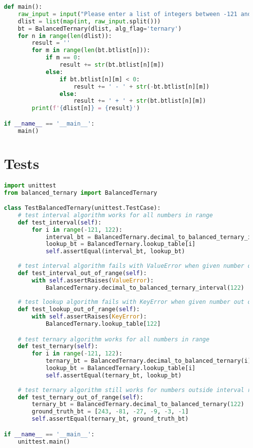 \documentclass[12pt]{report}
\begin{document}
\begin{lstlisting}[language=Python, caption=balanced\_ternary.py]
def main():
    raw_input = input("Please enter a list of integers between -121 and 121, each separated by a space(i.e. 36 -74 13):")
    dlist = list(map(int, raw_input.split()))
    bt = BalancedTernary(dlist, alg_flag='ternary')
    for n in range(len(dlist)):
        result = ''
        for m in range(len(bt.btlist[n])):
            if m == 0:
                result += str(bt.btlist[n][m])
            else:
                if bt.btlist[n][m] < 0:
                    result += ' - ' + str(-bt.btlist[n][m])
                else:
                    result += ' + ' + str(bt.btlist[n][m])
        print(f'{dlist[n]} = {result}')

if __name__ == '__main__':
    main()
\end{lstlisting}
\chapter{Tests}
\begin{lstlisting}[language=Python, caption=balanced\_ternary\_tests.py]
import unittest
from balanced_ternary import BalancedTernary

class TestBalancedTernary(unittest.TestCase):
    # test interval algorithm works for all numbers in range
    def test_interval(self):
        for i in range(-121, 122):
            interval_bt = BalancedTernary.decimal_to_balanced_ternary_interval(i)
            lookup_bt = BalancedTernary.lookup_table[i]
            self.assertEqual(interval_bt, lookup_bt)
    
    # test interval algorithm fails with ValueError when given number out of range
    def test_interval_out_of_range(self):
        with self.assertRaises(ValueError):
            BalancedTernary.decimal_to_balanced_ternary_interval(122)
    
    # test lookup algorithm fails with KeyError when given number out of range
    def test_lookup_out_of_range(self):
        with self.assertRaises(KeyError):
            BalancedTernary.lookup_table[122]

    # test ternary algorithm works for all numbers in range
    def test_ternary(self):
        for i in range(-121, 122):
            ternary_bt = BalancedTernary.decimal_to_balanced_ternary(i)
            lookup_bt = BalancedTernary.lookup_table[i]
            self.assertEqual(ternary_bt, lookup_bt)
    
    # test ternary algorithm still works for numbers outside interval range
    def test_ternary_out_of_range(self):
        ternary_bt = BalancedTernary.decimal_to_balanced_ternary(122)
        ground_truth_bt = [243, -81, -27, -9, -3, -1]
        self.assertEqual(ternary_bt, ground_truth_bt)

if __name__ == '__main__':
    unittest.main()
\end{lstlisting}
\end{document}
